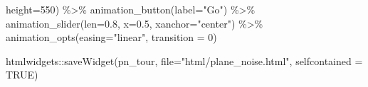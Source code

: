 \documentclass[
  letterpaper,
]{krantz}
\newenvironment{Shaded}{\begin{snugshade}}{\end{snugshade}}
\newcommand{\AttributeTok}[1]{\textcolor[rgb]{0.40,0.45,0.13}{#1}}
\newcommand{\ConstantTok}[1]{\textcolor[rgb]{0.56,0.35,0.01}{#1}}
\newcommand{\DecValTok}[1]{\textcolor[rgb]{0.68,0.00,0.00}{#1}}
\newcommand{\FloatTok}[1]{\textcolor[rgb]{0.68,0.00,0.00}{#1}}
\newcommand{\FunctionTok}[1]{\textcolor[rgb]{0.28,0.35,0.67}{#1}}
\newcommand{\NormalTok}[1]{\textcolor[rgb]{0.00,0.23,0.31}{#1}}
\newcommand{\SpecialCharTok}[1]{\textcolor[rgb]{0.37,0.37,0.37}{#1}}
\newcommand{\StringTok}[1]{\textcolor[rgb]{0.13,0.47,0.30}{#1}}
\begin{document}
\begin{Shaded}
\begin{Highlighting}[]
                        \AttributeTok{height=}\DecValTok{550}\NormalTok{) }\SpecialCharTok{\%\textgreater{}\%}
       \FunctionTok{animation\_button}\NormalTok{(}\AttributeTok{label=}\StringTok{"Go"}\NormalTok{) }\SpecialCharTok{\%\textgreater{}\%}
       \FunctionTok{animation\_slider}\NormalTok{(}\AttributeTok{len=}\FloatTok{0.8}\NormalTok{, }\AttributeTok{x=}\FloatTok{0.5}\NormalTok{,}
                        \AttributeTok{xanchor=}\StringTok{"center"}\NormalTok{) }\SpecialCharTok{\%\textgreater{}\%}
       \FunctionTok{animation\_opts}\NormalTok{(}\AttributeTok{easing=}\StringTok{"linear"}\NormalTok{, }
                      \AttributeTok{transition =} \DecValTok{0}\NormalTok{)}

\NormalTok{htmlwidgets}\SpecialCharTok{::}\FunctionTok{saveWidget}\NormalTok{(pn\_tour,}
          \AttributeTok{file=}\StringTok{"html/plane\_noise.html"}\NormalTok{,}
          \AttributeTok{selfcontained =} \ConstantTok{TRUE}\NormalTok{)}
\end{Highlighting}
\end{Shaded}
\end{document}
